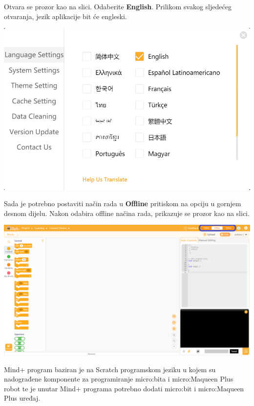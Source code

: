\vspace{3mm}

Otvara se prozor kao na slici. Odaberite \textbf{English}. Prilikom svakog sljedećeg otvaranja, jezik aplikacije bit će engleski.

\vspace{3mm}

\includegraphics[scale=0.6]{Mindplus2.png}

\vspace{3mm}

Sada je potrebno postaviti način rada u \textbf{Offline} pritiskom na opciju u gornjem desnom dijelu. Nakon odabira offline načina rada, prikazuje se prozor kao na slici.

\vspace{3mm}

\includegraphics[scale=0.35]{Mindplus3.png}

\vspace{3mm}

Mind+ program baziran je na Scratch programskom jeziku u kojem su nadograđene komponente za programiranje micro:bita i micro:Maqueen Plus robot te je unutar Mind+ programa potrebno dodati micro:bit i micro:Maqueen Plus uređaj.

